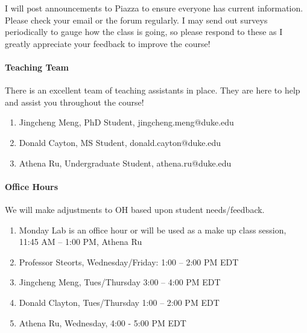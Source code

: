 \documentclass[11pt]{article}
\begin{document}
I will post announcements to Piazza to ensure everyone has current information. Please check your email or the forum regularly. I may send out surveys periodically to gauge how the class is going, so please respond to these as I greatly appreciate your feedback to improve the course! 

\paragraph{Teaching Team}
There is an excellent team of teaching assistants in place. They are here to help and assist you throughout the course! 

\begin{enumerate}
\item Jingcheng Meng, PhD Student, jingcheng.meng@duke.edu
\item  Donald Cayton, MS Student, donald.cayton@duke.edu
\item  Athena Ru, Undergraduate Student, athena.ru@duke.edu
\end{enumerate}


\paragraph{Office Hours}
We will make adjustments to OH based upon student needs/feedback. 
\begin{enumerate}
\item Monday Lab is an office hour or will be used as a make up class session, \\ 11:45 AM -- 1:00 PM, Athena Ru\\
\item Professor Steorts, Wednesday/Friday: 1:00 -- 2:00 PM EDT\\
\item  Jingcheng Meng, Tues/Thursday 3:00 -- 4:00 PM EDT \\
\item Donald Clayton, Tues/Thursday 1:00 -- 2:00 PM EDT \\
\item Athena Ru, Wednesday, 4:00 - 5:00 PM EDT \\
\end{enumerate}
\end{document}
